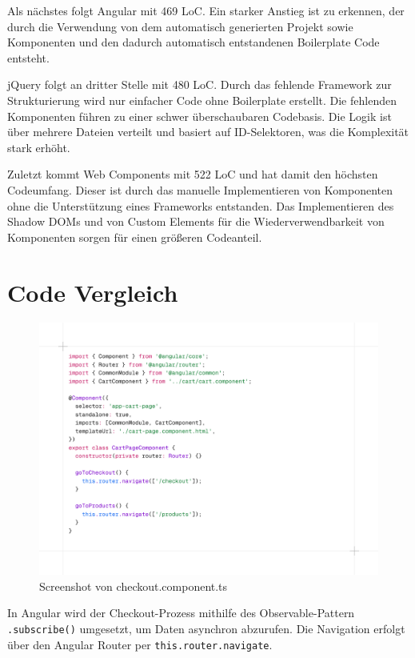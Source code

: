 \documentclass[oneside]{ausarbeitung}
\begin{document}
Als nächstes folgt Angular mit 469 LoC. Ein starker Anstieg ist zu erkennen, der durch die Verwendung von dem automatisch generierten Projekt sowie Komponenten und den dadurch automatisch entstandenen Boilerplate Code entsteht. 

jQuery folgt an dritter Stelle mit 480 LoC. Durch das fehlende Framework zur Strukturierung wird nur einfacher Code ohne Boilerplate erstellt. Die fehlenden Komponenten führen zu einer schwer überschaubaren Codebasis. Die Logik ist über mehrere Dateien verteilt und basiert auf ID-Selektoren,  was die Komplexität stark erhöht. 

Zuletzt kommt Web Components mit 522 LoC und hat damit den höchsten Codeumfang. Dieser ist durch das manuelle Implementieren von Komponenten ohne die Unterstützung eines Frameworks entstanden. Das Implementieren des Shadow DOMs und von Custom Elements für die Wiederverwendbarkeit von Komponenten sorgen für einen größeren Codeanteil. 

\section{Code Vergleich}

\begin{figure}[H]
    \centering
    \includegraphics[width=\linewidth]{images/acheckoutcomponent.png}
    \caption{Screenshot von checkout.component.ts}
    \label{fig:acheckout}
\end{figure}


In Angular wird der Checkout-Prozess mithilfe des Observable-Pattern \texttt{.subscribe()} umgesetzt, um Daten asynchron abzurufen. Die Navigation erfolgt über den Angular Router per \texttt{this.router.navigate}.
\end{document}

